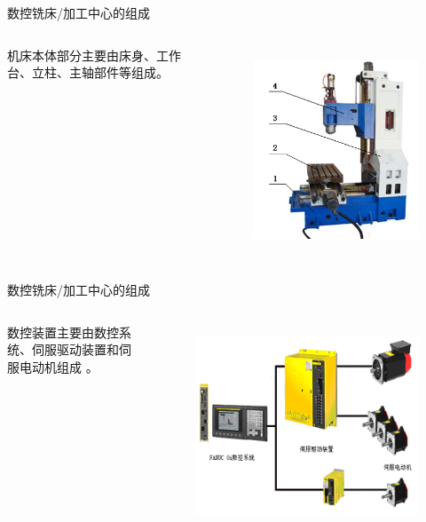 \documentclass[UTF8,zihao=-4]{ctexbeamer}
\begin{document}
\begin{frame}{数控铣床/加工中心的组成}
\begin{columns}
机床本体部分主要由床身、工作台、立柱、主轴部件等组成。 
	\begin{figure}
		\centering
		\includegraphics[width= 0.8\linewidth]{image/1-10}
		\label{fig:1-10}
	\end{figure}
\end{columns}
\end{frame}

\begin{frame}{数控铣床/加工中心的组成}
\begin{columns}
	数控装置主要由数控系统、伺服驱动装置和伺服电动机组成 。 
	\begin{figure}
		\centering
		\includegraphics[width= 0.8\linewidth]{image/1-11}
		\label{fig:1-11}
	\end{figure}
\end{columns}
\end{frame}
\end{document}
